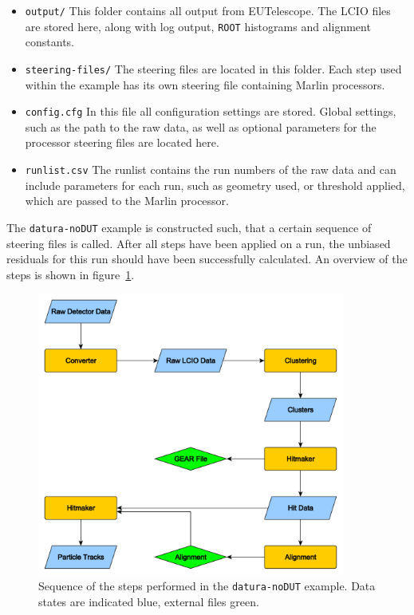 \begin{itemize}

\item \texttt{output/} This folder contains all output from EUTelescope. The
LCIO files are stored here, along with log output, \texttt{ROOT} histograms and
alignment constants.

\item \texttt{steering-files/} The steering files are located in this folder.
Each step used within the example has its own steering file containing Marlin
processors.

\item\texttt{config.cfg} In this file all configuration settings are stored.
Global settings, such as the path to the raw data, as well as optional
parameters for the processor steering files are located here.

\item \texttt{runlist.csv} The runlist contains the run numbers of the raw
data and can include parameters for each run, such as geometry used, or
threshold applied, which are passed to the Marlin processor.

\end{itemize}

The \texttt{datura-noDUT} example is constructed such, that a certain sequence
of steering files is called. After all steps have been applied on a run, the
unbiased residuals for this run should have been successfully calculated. An
overview of the steps is shown in figure~\ref{fig:datura-nodutsequence}.

\begin{figure}[hbt]
  \centering
  \includegraphics[width=0.9\textwidth]{figures/datura-noDUT.pdf}
  \caption[Steps performed in the \texttt{datura-noDUT} example]{Sequence of the
steps performed in the \texttt{datura-noDUT} example. Data states are indicated
blue, external files green.}
  \label{fig:datura-nodutsequence}
\end{figure}

